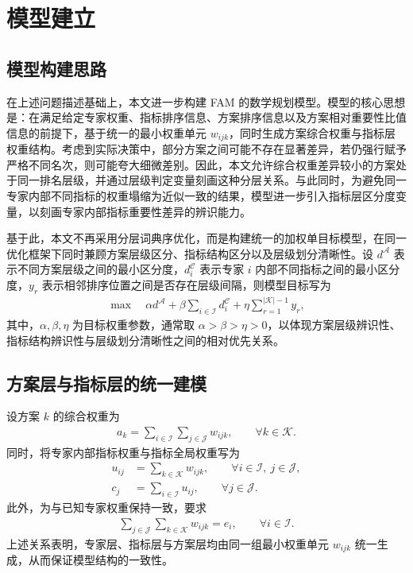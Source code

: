 \documentclass{article}
\begin{document}
\section{模型建立}

\subsection{模型构建思路}

在上述问题描述基础上，本文进一步构建 FAM 的数学规划模型。模型的核心思想是：在满足给定专家权重、指标排序信息、方案排序信息以及方案相对重要性比值信息的前提下，基于统一的最小权重单元 $w_{ijk}$，同时生成方案综合权重与指标层权重结构。考虑到实际决策中，部分方案之间可能不存在显著差异，若仍强行赋予严格不同名次，则可能夸大细微差别。因此，本文允许综合权重差异较小的方案处于同一排名层级，并通过层级判定变量刻画这种分层关系。与此同时，为避免同一专家内部不同指标的权重塌缩为近似一致的结果，模型进一步引入指标层区分度变量，以刻画专家内部指标重要性差异的辨识能力。

基于此，本文不再采用分层词典序优化，而是构建统一的加权单目标模型，在同一优化框架下同时兼顾方案层级区分、指标结构区分以及层级划分清晰性。设 $d^{\mathcal A}$ 表示不同方案层级之间的最小区分度，$d_i^{\mathcal C}$ 表示专家 $i$ 内部不同指标之间的最小区分度，$y_r$ 表示相邻排序位置之间是否存在层级间隔，则模型目标写为
\begin{align}
    \max \quad \alpha d^{\mathcal A}+\beta \sum_{i\in\mathcal I} d_i^{\mathcal C}+\eta\sum_{r=1}^{|\mathcal K|-1} y_r,
\end{align}
其中，$\alpha,\beta,\eta$ 为目标权重参数，通常取 $\alpha>\beta>\eta>0$，以体现方案层级辨识性、指标结构辨识性与层级划分清晰性之间的相对优先关系。

\subsection{方案层与指标层的统一建模}

设方案 $k$ 的综合权重为
\begin{align}
    a_k=\sum_{i\in\mathcal{I}}\sum_{j\in\mathcal{J}} w_{ijk},
    \qquad \forall k\in\mathcal{K}.
\end{align}
同时，将专家内部指标权重与指标全局权重写为
\begin{align}
    u_{ij} &= \sum_{k\in\mathcal{K}} w_{ijk},
    \qquad \forall i\in\mathcal{I},\ j\in\mathcal{J}, \\
    c_j &= \sum_{i\in\mathcal{I}} u_{ij},
    \qquad \forall j\in\mathcal{J}.
\end{align}
此外，为与已知专家权重保持一致，要求
\begin{align}
    \sum_{j\in\mathcal{J}}\sum_{k\in\mathcal{K}} w_{ijk}=e_i,
    \qquad \forall i\in\mathcal{I}.
\end{align}
上述关系表明，专家层、指标层与方案层均由同一组最小权重单元 $w_{ijk}$ 统一生成，从而保证模型结构的一致性。
\end{document}
